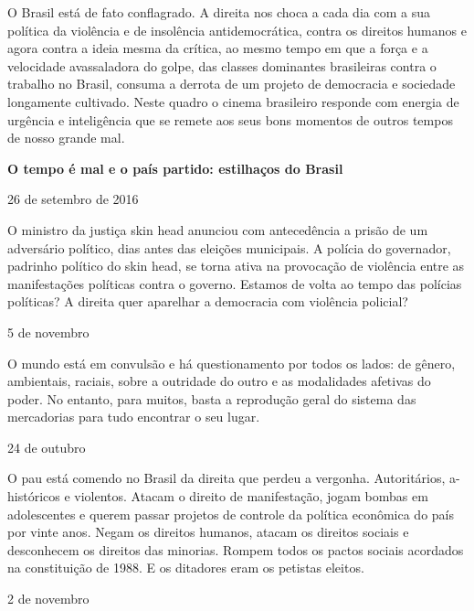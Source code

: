 O Brasil está de fato conflagrado. A direita nos choca a cada dia com a
sua política da violência e de insolência antidemocrática, contra os
direitos humanos e agora contra a ideia mesma da crítica, ao mesmo tempo
em que a força e a velocidade avassaladora do golpe, das classes
dominantes brasileiras contra o trabalho no Brasil, consuma a derrota de
um projeto de democracia e sociedade longamente cultivado. Neste quadro
o cinema brasileiro responde com energia de urgência e inteligência que
se remete aos seus bons momentos de outros tempos de nosso grande mal.

\textbf{O tempo é mal e o país partido: estilhaços do Brasil}

26 de setembro de 2016

O ministro da justiça skin head anunciou com antecedência a prisão de um
adversário político, dias antes das eleições municipais. A polícia do
governador, padrinho político do skin head, se torna ativa na provocação
de violência entre as manifestações políticas contra o governo. Estamos
de volta ao tempo das polícias políticas? A direita quer aparelhar a
democracia com violência policial?

5 de novembro

O mundo está em convulsão e há questionamento por todos os lados: de
gênero, ambientais, raciais, sobre a outridade do outro e as modalidades
afetivas do poder. No entanto, para muitos, basta a reprodução geral do
sistema das mercadorias para tudo encontrar o seu lugar.

24 de outubro

O pau está comendo no Brasil da direita que perdeu a vergonha.
Autoritários, a-históricos e violentos. Atacam o direito de
manifestação, jogam bombas em adolescentes e querem passar projetos de
controle da política econômica do país por vinte anos. Negam os direitos
humanos, atacam os direitos sociais e desconhecem os direitos das
minorias. Rompem todos os pactos sociais acordados na constituição de
1988. E os ditadores eram os petistas eleitos.

2 de novembro

